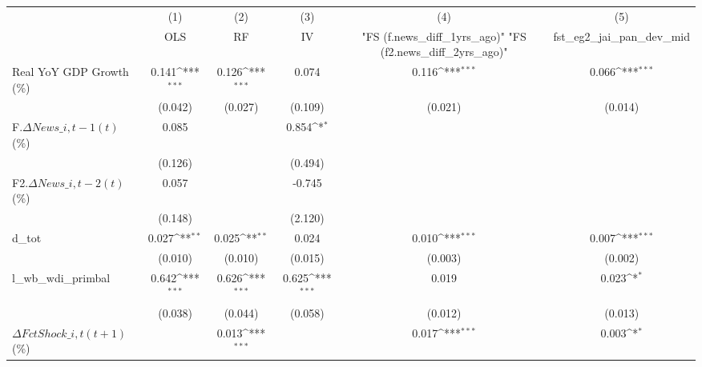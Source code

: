 {
\def\sym#1{\ifmmode^{#1}\else\(^{#1}\)\fi}
\begin{tabular}{l*{5}{c}}
\toprule
                    &\multicolumn{1}{c}{(1)}&\multicolumn{1}{c}{(2)}&\multicolumn{1}{c}{(3)}&\multicolumn{1}{c}{(4)}&\multicolumn{1}{c}{(5)}\\
                    &\multicolumn{1}{c}{OLS}&\multicolumn{1}{c}{RF}&\multicolumn{1}{c}{IV}&\multicolumn{1}{c}{ "FS (f.news\_diff\_1yrs\_ago)"  "FS (f2.news\_diff\_2yrs\_ago)" }&\multicolumn{1}{c}{fst\_eg2\_jai\_pan\_dev\_mid}\\
\midrule
Real YoY GDP Growth (\%)&       0.141\sym{***}&       0.126\sym{***}&       0.074         &       0.116\sym{***}&       0.066\sym{***}\\
                    &     (0.042)         &     (0.027)         &     (0.109)         &     (0.021)         &     (0.014)         \\
\addlinespace
F.$ \Delta News\_{i,t-1}(t)$ (\%)&       0.085         &                     &       0.854\sym{*}  &                     &                     \\
                    &     (0.126)         &                     &     (0.494)         &                     &                     \\
\addlinespace
F2.$ \Delta News\_{i,t-2}(t)$ (\%)&       0.057         &                     &      -0.745         &                     &                     \\
                    &     (0.148)         &                     &     (2.120)         &                     &                     \\
\addlinespace
d\_tot               &       0.027\sym{**} &       0.025\sym{**} &       0.024         &       0.010\sym{***}&       0.007\sym{***}\\
                    &     (0.010)         &     (0.010)         &     (0.015)         &     (0.003)         &     (0.002)         \\
\addlinespace
l\_wb\_wdi\_primbal    &       0.642\sym{***}&       0.626\sym{***}&       0.625\sym{***}&       0.019         &       0.023\sym{*}  \\
                    &     (0.038)         &     (0.044)         &     (0.058)         &     (0.012)         &     (0.013)         \\
\addlinespace
$ \Delta FctShock\_{i,t}(t+1)$ (\%)&                     &       0.013\sym{***}&                     &       0.017\sym{***}&       0.003\sym{*}  \\

\end{tabular}}
